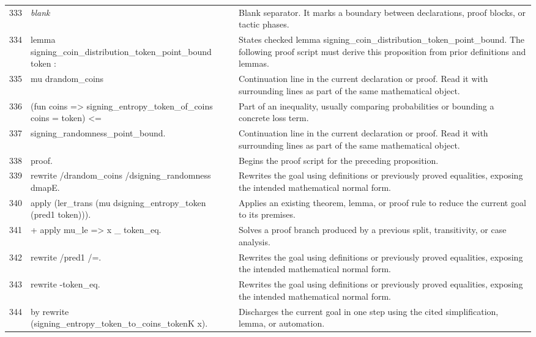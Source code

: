 \documentclass[10pt]{article}
\begin{document}
\begin{longtable}{r L{0.53\textwidth} L{0.37\textwidth}}
333 & {\ttfamily\scriptsize \emph{blank}} & Blank separator.  It marks a boundary between declarations, proof blocks, or tactic phases. \\
334 & {\ttfamily\scriptsize lemma signing\_coin\_distribution\_token\_point\_bound token :} & States checked lemma signing\_coin\_distribution\_token\_point\_bound.  The following proof script must derive this proposition from prior definitions and lemmas. \\
335 & {\ttfamily\scriptsize   mu drandom\_coins} & Continuation line in the current declaration or proof.  Read it with surrounding lines as part of the same mathematical object. \\
336 & {\ttfamily\scriptsize     (fun coins => signing\_entropy\_token\_of\_coins coins = token) <=} & Part of an inequality, usually comparing probabilities or bounding a concrete loss term. \\
337 & {\ttfamily\scriptsize   signing\_randomness\_point\_bound.} & Continuation line in the current declaration or proof.  Read it with surrounding lines as part of the same mathematical object. \\
338 & {\ttfamily\scriptsize proof.} & Begins the proof script for the preceding proposition. \\
339 & {\ttfamily\scriptsize rewrite /drandom\_coins /dsigning\_randomness dmapE.} & Rewrites the goal using definitions or previously proved equalities, exposing the intended mathematical normal form. \\
340 & {\ttfamily\scriptsize apply (ler\_trans (mu dsigning\_entropy\_token (pred1 token))).} & Applies an existing theorem, lemma, or proof rule to reduce the current goal to its premises. \\
341 & {\ttfamily\scriptsize + apply mu\_le => x \_ token\_eq.} & Solves a proof branch produced by a previous split, transitivity, or case analysis. \\
342 & {\ttfamily\scriptsize   rewrite /pred1 /=.} & Rewrites the goal using definitions or previously proved equalities, exposing the intended mathematical normal form. \\
343 & {\ttfamily\scriptsize   rewrite -token\_eq.} & Rewrites the goal using definitions or previously proved equalities, exposing the intended mathematical normal form. \\
344 & {\ttfamily\scriptsize   by rewrite (signing\_entropy\_token\_to\_coins\_tokenK x).} & Discharges the current goal in one step using the cited simplification, lemma, or automation. \\

\end{longtable}
\end{document}
